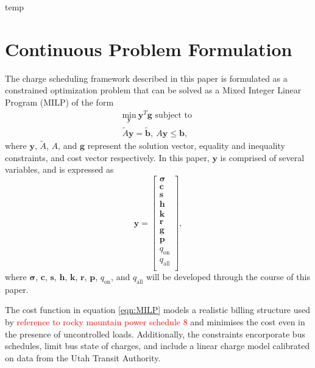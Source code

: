 \newpage temp \newpage
\section{Continuous Problem Formulation\label{sec:4_formulation}}
The charge scheduling framework described in this paper is formulated as a constrained optimization problem that can be solved as a Mixed Integer Linear Program (MILP) of the form
\begin{equation}\label{eqn:MILP}\begin{matrix}
	\underset{\mathbf{y}}{\text{min}} \ \mathbf{y}^T\mathbf{g} \text{ subject to } \\
	\tilde{A}\mathbf{y} = \tilde{\mathbf{b}}, \ A\mathbf{y} \le \mathbf{b},
\end{matrix} \end{equation}
where $\mathbf{y}$, $\tilde{A}$, $A$, and $\mathbf{g}$ represent the solution vector, equality and inequality constraints, and cost vector respectively. In this paper, $\mathbf{y}$ is comprised of several variables, and is expressed as 
\begin{equation}
	\mathbf{y} = \begin{bmatrix}
			\mathbf{\sigma} \\ 
			\mathbf{c}      \\ 
			\mathbf{s}      \\ 
			\mathbf{h}      \\ 
			\mathbf{k}      \\ 
			\mathbf{r}      \\ 
			\mathbf{g}      \\
			\mathbf{p}      \\ 
			q_{\text{on}}   \\ 
			q_{\text{all}}  \\
		     \end{bmatrix},
\end{equation}
where $\mathbf{\sigma}$, $\mathbf{c}$, $\mathbf{s}$, $\mathbf{h}$, $\mathbf{k}$, $\mathbf{r}$, $\mathbf{p}$, $q_{\text{on}}$, and $q_{\text{all}}$ will be developed through the course of this paper.
\par The cost function in equation \ref{eqn:MILP} models a realistic billing structure used by \textcolor{red}{reference to rocky mountain power schedule 8} and minimises the cost even in the presence of uncontrolled loads. Additionally, the constraints encorporate bus schedules, limit bus state of charges, and include a linear charge model calibrated on data from the Utah Transit Authority.
